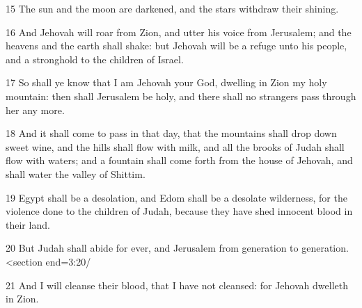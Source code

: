 \par 15 The sun and the moon are darkened, and the stars withdraw their shining.
\par 16 And Jehovah will roar from Zion, and utter his voice from Jerusalem; and the heavens and the earth shall shake: but Jehovah will be a refuge unto his people, and a stronghold to the children of Israel.
\par 17 So shall ye know that I am Jehovah your God, dwelling in Zion my holy mountain: then shall Jerusalem be holy, and there shall no strangers pass through her any more.
\par 18 And it shall come to pass in that day, that the mountains shall drop down sweet wine, and the hills shall flow with milk, and all the brooks of Judah shall flow with waters; and a fountain shall come forth from the house of Jehovah, and shall water the valley of Shittim.
\par 19 Egypt shall be a desolation, and Edom shall be a desolate wilderness, for the violence done to the children of Judah, because they have shed innocent blood in their land.
\par 20 But Judah shall abide for ever, and Jerusalem from generation to generation. <section end=3:20/
\par 21 And I will cleanse their blood, that I have not cleansed: for Jehovah dwelleth in Zion.

